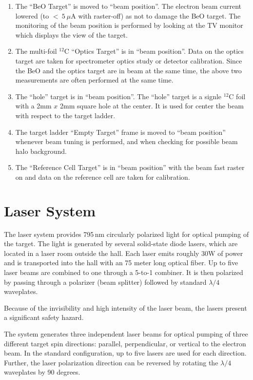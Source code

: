 {\begin{safetyen}{10}{5}
\begin{enumerate}
\item 
The ``BeO Target'' is moved to ``beam position''.
The electron beam current lowered (to $<~5~\mu$A with raster-off) 
as not to damage the 
BeO target.  The monitoring of the beam
position is performed by looking at the TV monitor which displays the
view of the target.

\item 
The multi-foil $^{12}$C ``Optics Target'' is in ``beam position''. Data on the optics
target are taken for spectrometer optics study or detector calibration.
Since the BeO and the optics target are in beam at the same time, the above 
two measurements are often performed at the same time.

\item
The ``hole'' target is in ``beam position''. The ``hole'' target is
a signle $^{12}$C foil with a 2mm $x$ 2mm square hole at the center. It is used for
center the beam with respect to the target ladder.  

\item 
The target ladder ``Empty Target''
frame is moved to ``beam position'' whenever
beam tuning is performed, and when checking for possible beam halo
background.

\item  
The ``Reference Cell Target'' is in ``beam position'' with the beam fast
raster on and data on the reference cell are taken for calibration.


\end{enumerate}

\end{safetyen}
\section{Laser System}
\label{sec:lasers}

The laser system provides 795\,nm circularly polarized light for optical
pumping of the target. The light is generated by several solid-state
diode lasers, which are located in a laser room outside the hall.
Each laser emits roughly 30W of
power and is transported into the hall with an 75 meter long optical 
fiber. Up to five laser beams are combined to one through a 5-to-1 combiner.
It is then polarized by passing through a polarizer 
(beam splitter) followed by standard $\lambda/4$ waveplates.  
\begin{safetyen}{10}{5}
  Because of the invisibility and high intensity of the
laser beam, the lasers present a significant safety hazard.
\end{safetyen}
The system generates three independent laser beams for optical
pumping of three different target spin directions: parallel,
perpendicular, or vertical to the electron beam.  In the standard
configuration, up to five lasers are used for each direction.  
Further, the laser polarization direction can be reversed 
by rotating the $\lambda/4$ waveplates by 90 degrees.

}
